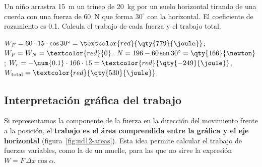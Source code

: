 \begin{exercise}
    Un niño arrastra \qty{15}{\m} un trineo de \qty{20}{\kg} por un suelo horizontal tirando de una cuerda con una fuerza de
    \qty{60}{\newton} que forma \(30^\circ\) con la horizontal. El coeficiente de rozamiento es \num{0.1}. Calcula el trabajo de cada
    fuerza y el trabajo total.
    \begin{solu}
        \(W_F = 60 \cdot 15 \cdot \cos 30^\circ = \textcolor{red}{\qty{779}{\joule}}\); \(W_P = W_N = \textcolor{red}{0}\).
        \(N = 196 - 60\sen 30^\circ = \qty{166}{\newton}\); \(W_r = -\num{0.1} \cdot 166 \cdot 15 = \textcolor{red}{\qty{-249}{\joule}}\).
        \(W_{\text{total}} = \textcolor{red}{\qty{530}{\joule}}\).
    \end{solu}
\end{exercise}

\subsection{Interpretación gráfica del trabajo}

Si representamos la componente de la fuerza en la dirección del movimiento frente a la posición, el \textbf{trabajo es el área
comprendida entre la gráfica y el eje horizontal} (figura~\ref{fig:ud12-areas}). Esta idea permite calcular el trabajo de fuerzas
variables, como la de un muelle, para las que no sirve la expresión \(W = F\,\Delta x\cos\alpha\).

